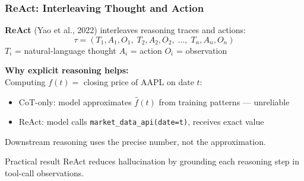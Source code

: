 \documentclass[9pt,t]{beamer}
\begin{document}
\begin{frame}
\frametitle{ReAct: Interleaving Thought and Action}

\begin{underhood}
\textbf{ReAct} (Yao et al., 2022) interleaves reasoning traces and actions:
\[
  \tau = (T_1, A_1, O_1,\; T_2, A_2, O_2,\; \ldots,\; T_n, A_n, O_n)
\]
$T_i$ = natural-language thought \quad $A_i$ = action \quad $O_i$ = observation
\end{underhood}

\medskip
\textbf{Why explicit reasoning helps:}\\
Computing $f(t) = $ closing price of AAPL on date $t$:
\begin{itemize}
  \item CoT-only: model approximates $\hat{f}(t)$ from training patterns --- unreliable
  \item ReAct: model calls \texttt{market\_data\_api(date=t)}, receives exact value
\end{itemize}
Downstream reasoning uses the precise number, not the approximation.

\medskip
\begin{block}{Practical result}
ReAct reduces hallucination by grounding each reasoning step in tool-call observations.
\end{block}
\end{frame}
\end{document}
